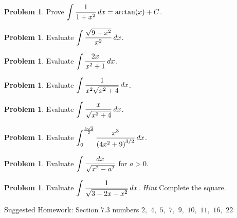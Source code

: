 \documentclass[letterpaper, twoside, 12pt]{book}
\theoremstyle{definition}
\theoremstyle{definition}
\newtheorem{problem}[theorem]{Problem}
\newcommand{\ds}{\ensuremath{\displaystyle}}
\begin{document}
\begin{problem}
 Prove $\ds \int \frac{1}{1+x^2}\, dx = \arctan(x)+C$.
\end{problem}

\vfill

\begin{problem}
 Evaluate $\ds \int \frac{\sqrt{9-x^2}}{x^2} \, dx$.
\end{problem}

\vfill

\newpage

\begin{problem}
 Evaluate $\ds \int \frac{2x}{x^2+1}\, dx$.
\end{problem}

\vfill

\begin{problem}
 Evaluate $\ds \int \frac{1}{x^2\sqrt{x^2+4}} \, dx$.
\end{problem}

\vfill

\newpage

\begin{problem}
 Evaluate $\ds \int \frac{x}{\sqrt{x^2 + 4}} \, dx$.
\end{problem}

\vfill

\begin{problem}
 Evaluate $\ds \int_0^{\frac{3\sqrt{3}}{2}} \frac{x^3}{\left(4x^2+9\right)^{3/2}} \, dx$.
\end{problem}

\vfill

\newpage

\begin{problem}
 Evaluate $\ds \int \frac{dx}{\sqrt{x^2-a^2}}$ for $a >0$.
\end{problem}

\vfill

\begin{problem}
 Evaluate $\ds \int \frac{1}{\sqrt{3-2x-x^2}} \, dx$.  \emph{Hint} Complete the square.
\end{problem}

\vfill

\noindent Suggested Homework: Section $7.3$ numbers $2,$ $4,$ $5,$ $7,$ $9,$ $10,$ $11,$ $16,$ $22$


\end{document}
